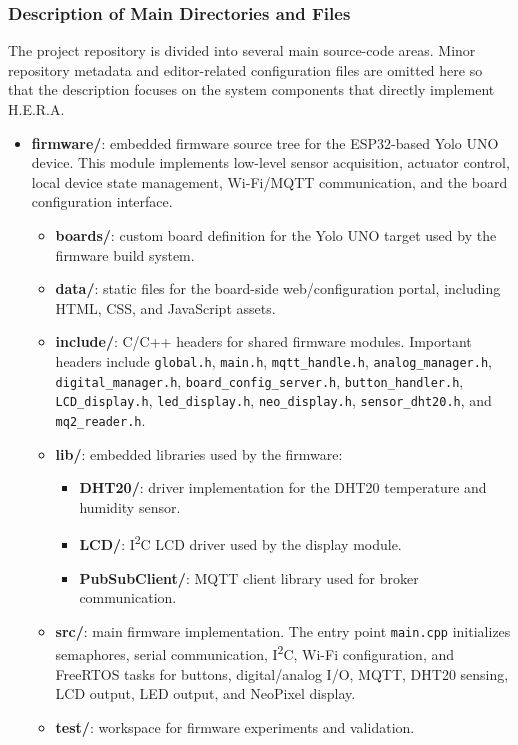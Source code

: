 \subsubsection{Description of Main Directories and Files}

The project repository is divided into several main source-code areas. Minor repository metadata and editor-related configuration files are omitted here so that the description focuses on the system components that directly implement H.E.R.A.

\begin{itemize}
  \item \textbf{firmware/}: embedded firmware source tree for the ESP32-based Yolo UNO device. This module implements low-level sensor acquisition, actuator control, local device state management, Wi-Fi/MQTT communication, and the board configuration interface.
    \begin{itemize}
      \item \textbf{boards/}: custom board definition for the Yolo UNO target used by the firmware build system.
      \item \textbf{data/}: static files for the board-side web/configuration portal, including HTML, CSS, and JavaScript assets.
      \item \textbf{include/}: C/C++ headers for shared firmware modules. Important headers include \texttt{global.h}, \texttt{main.h}, \texttt{mqtt\_handle.h}, \texttt{analog\_manager.h}, \texttt{digital\_manager.h}, \texttt{board\_config\_server.h}, \texttt{button\_handler.h}, \texttt{LCD\_display.h}, \texttt{led\_display.h}, \texttt{neo\_display.h}, \texttt{sensor\_dht20.h}, and \texttt{mq2\_reader.h}.
      \item \textbf{lib/}: embedded libraries used by the firmware:
        \begin{itemize}
          \item \textbf{DHT20/}: driver implementation for the DHT20 temperature and humidity sensor.
          \item \textbf{LCD/}: I\textsuperscript{2}C LCD driver used by the display module.
          \item \textbf{PubSubClient/}: MQTT client library used for broker communication.
        \end{itemize}
      \item \textbf{src/}: main firmware implementation. The entry point \texttt{main.cpp} initializes semaphores, serial communication, I\textsuperscript{2}C, Wi-Fi configuration, and FreeRTOS tasks for buttons, digital/analog I/O, MQTT, DHT20 sensing, LCD output, LED output, and NeoPixel display.
      \item \textbf{test/}: workspace for firmware experiments and validation.
    \end{itemize}


\end{itemize}
